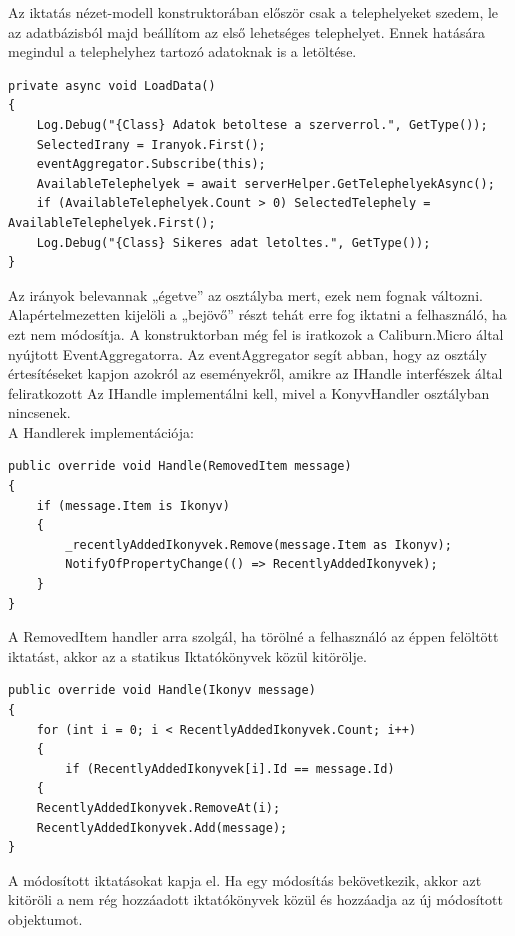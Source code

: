 \documentclass[
]{thesis-ekf}
\theoremstyle{definition}
\theoremstyle{remark}
\begin{document}
Az iktatás nézet-modell konstruktorában először csak a telephelyeket szedem, le az adatbázisból majd beállítom az első lehetséges telephelyet. Ennek hatására megindul a telephelyhez tartozó adatoknak is a letöltése. 
\begin{lstlisting}
private async void LoadData()
{
	Log.Debug("{Class} Adatok betoltese a szerverrol.", GetType());
	SelectedIrany = Iranyok.First();
	eventAggregator.Subscribe(this);
	AvailableTelephelyek = await serverHelper.GetTelephelyekAsync();
	if (AvailableTelephelyek.Count > 0) SelectedTelephely = AvailableTelephelyek.First();
	Log.Debug("{Class} Sikeres adat letoltes.", GetType());
}
\end{lstlisting}
Az irányok belevannak „égetve” az osztályba mert, ezek nem fognak változni. Alapértelmezetten kijelöli a „bejövő” részt tehát erre fog iktatni a felhasználó, ha ezt nem módosítja. A konstruktorban még fel is iratkozok a Caliburn.Micro által nyújtott EventAggregatorra. Az eventAggregator segít abban, hogy az osztály értesítéseket kapjon azokról az eseményekről, amikre az IHandle interfészek által feliratkozott Az IHandle implementálni kell, mivel a KonyvHandler osztályban nincsenek.\\
A Handlerek implementációja:
\begin{lstlisting}
public override void Handle(RemovedItem message)
{
	if (message.Item is Ikonyv)
	{
		_recentlyAddedIkonyvek.Remove(message.Item as Ikonyv);
		NotifyOfPropertyChange(() => RecentlyAddedIkonyvek);
	}
}
\end{lstlisting}
A RemovedItem handler arra szolgál, ha törölné a felhasználó az éppen felöltött iktatást, akkor az a statikus Iktatókönyvek közül kitörölje. 
\begin{lstlisting}
public override void Handle(Ikonyv message)
{
	for (int i = 0; i < RecentlyAddedIkonyvek.Count; i++)
	{
		if (RecentlyAddedIkonyvek[i].Id == message.Id)
	{
	RecentlyAddedIkonyvek.RemoveAt(i);
	RecentlyAddedIkonyvek.Add(message);
}

\end{lstlisting}
A módosított iktatásokat kapja el. Ha egy módosítás bekövetkezik, akkor azt kitöröli a nem rég hozzáadott iktatókönyvek közül és hozzáadja az új módosított objektumot.
\end{document}
